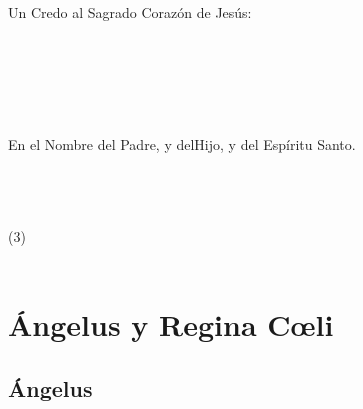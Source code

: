 \documentclass[10pt,a4paper,oneside]{book}
\begin{document}
\bigskip
{\label{creed-apostles}}
Un Credo al Sagrado Corazón de Jesús:\\
\smallskip
\begin{minipage}[t]{0.475\textwidth}
      \\

      \\

      \\

      \\

      \\

      En el Nombre del Padre, y del{\redcross}Hijo, y del Espíritu Santo.
\end{minipage}
\begin{minipage}[t]{0.475\textwidth}
      \\

      \\

      \\

      (3)\\[1mm]

      \\[1mm]
  
      
\end{minipage}
\chapter*{Ángelus y Regina C{\oe}li}

\section*{Ángelus}
\end{document}
